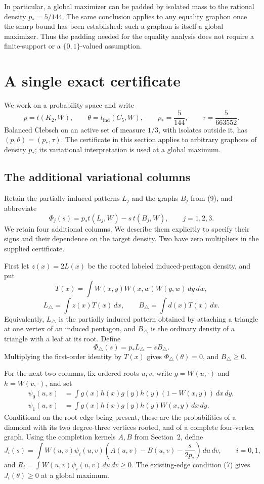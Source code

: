 In particular, a global maximizer can be padded by isolated mass to the
rational density \(p_*=5/144\). The same conclusion applies to any
equality graphon once the sharp bound has been established: such a graphon
is itself a global maximizer. Thus the padding needed for the equality
analysis does not require a finite-support or a \(\{0,1\}\)-valued
assumption.

\section{A single exact certificate}

We work on a probability space and write
\[
 p=t(K_2,W),\qquad\theta=t_{\mathrm{ind}}(C_5,W),\qquad
 p_*=\frac5{144},\qquad\tau=\frac5{663552}.
\]
Balanced Clebsch on an active set of measure \(1/3\), with isolates outside
it, has \((p,\theta)=(p_*,\tau)\). The certificate in this section applies
to arbitrary graphons of density \(p_*\); its variational interpretation
is used at a global maximum.

\subsection{The additional variational columns}

Retain the partially induced patterns \(L_j\) and the graphs \(B_j\) from
(9), and abbreviate
\[
 \Phi_j(s)=p_*t(L_j,W)-s\,t(B_j,W),\qquad j=1,2,3.
\]
We retain four additional columns. We describe them explicitly to specify
their signs and their dependence on the target density. Two have zero
multipliers in the supplied certificate.

First let \(z(x)=2L(x)\) be the rooted labeled induced-pentagon density,
and put
\[
 T(x)=\int W(x,y)W(x,w)W(y,w)\,dy\,dw,
\]
\[
 L_\triangle=\int z(x)T(x)\,dx,\qquad
 B_\triangle=\int d(x)T(x)\,dx.
\]
Equivalently, \(L_\triangle\) is the partially induced pattern obtained
by attaching a triangle at one vertex of an induced pentagon, and
\(B_\triangle\) is the ordinary density of a triangle with a leaf at its
root. Define
\[
 \Phi_\triangle(s)=p_*L_\triangle-sB_\triangle.
\]
Multiplying the first-order identity by \(T(x)\) gives
\(\Phi_\triangle(\theta)=0\), and \(B_\triangle\ge0\).

For the next two columns, fix ordered roots \(u,v\), write \(g=W(u,\cdot)\)
and \(h=W(v,\cdot)\), and set
\begin{align*}
 \psi_0(u,v)&=\int g(x)h(x)g(y)h(y)(1-W(x,y))\,dx\,dy,\\
 \psi_1(u,v)&=\int g(x)h(x)g(y)h(y)W(x,y)\,dx\,dy.
\end{align*}
Conditional on the root edge being present, these are the probabilities of
a diamond with its two degree-three vertices rooted, and of a complete
four-vertex graph. Using the completion kernels \(A,B\) from Section~2,
define
\[
 J_i(s)=\int W(u,v)\psi_i(u,v)
       \left(A(u,v)-B(u,v)-\frac{s}{2p_*}\right)\,du\,dv,
       \qquad i=0,1,
\]
and \(R_i=\int W(u,v)\psi_i(u,v)\,du\,dv\ge0\).
The existing-edge condition (7) gives \(J_i(\theta)\ge0\) at a global
maximum.

